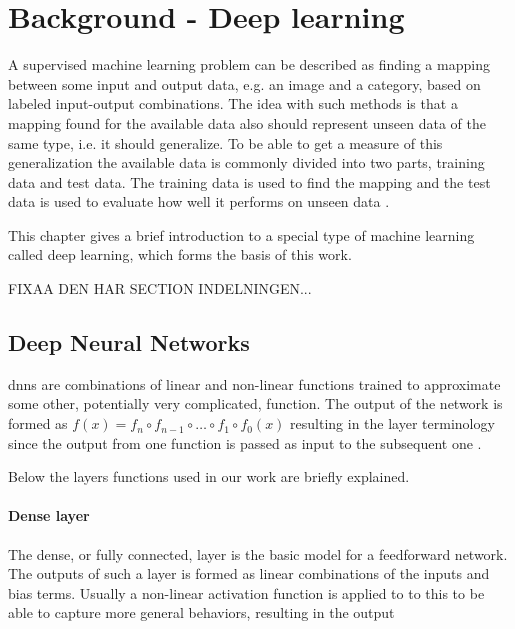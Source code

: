 \chapter{Background - Deep learning}

A supervised machine learning problem can be described as finding a mapping between some input and output data, e.g. an image and a category, based on labeled input-output combinations. The idea with such methods is that a mapping found for the available data also should represent unseen data of the same type, i.e. it should generalize. To be able to get a measure of this generalization the available data is commonly divided into two parts, training data and test data. The training data is used to find the mapping and the test data is used to evaluate how well it performs on unseen data \cite{Bishop2006}.

This chapter gives a brief introduction to a special type of machine learning called deep learning, which forms the basis of this work.

FIXAA DEN HAR SECTION INDELNINGEN...
\section{Deep Neural Networks}
\glspl{dnn} are combinations of linear and non-linear functions trained to approximate some other, potentially very complicated, function. The output of the network is formed as $f(x) = f_n \circ f_{n-1} \circ \hdots \circ f_1 \circ f_0(x)$ resulting in the layer terminology since the output from one function is passed as input to the subsequent one \cite{Goodfellow2016}.

Below the layers functions used in our work are briefly explained.

\subsubsection{Dense layer}
The dense, or fully connected, layer is the basic model for a feedforward network. The outputs of such a layer is formed as linear combinations of the inputs and bias terms. Usually a non-linear activation function is applied to to this to be able to capture more general behaviors, resulting in the output


